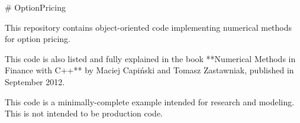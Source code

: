 
\begin{DoxyVerbInclude}
# OptionPricing

This repository contains object-oriented code implementing numerical methods for
option pricing.

This code is also listed and fully explained in the book **Numerical Methods in
Finance with C++** by Maciej Capiński and Tomasz Zastawniak, published in
September 2012.

This code is a minimally-complete example intended for research and modeling.
This is not intended to be production code.
\end{DoxyVerbInclude}
 